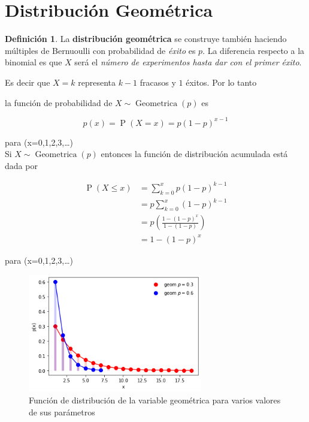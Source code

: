 \documentclass[]{book}
\theoremstyle{plain}
\theoremstyle{definition}
\newtheorem{definition}[theorem]{Definición}
\theoremstyle{definition} %
\begin{document}
\section{Distribución Geométrica} 

\begin{definition}
  
La \textbf{distribución geométrica} se construye también haciendo
múltiples de Bernuoulli con probabilidad de \emph{éxito} es \(p\). La
diferencia respecto a la binomial es que \(X\) será el \emph{número de
experimentos hasta dar con el primer éxito}.

Es decir que \(X=k\) representa \(k-1\) fracasos y \(1\) éxitos. Por lo
tanto

la función de probabilidad de
\(\displaystyle X\sim \operatorname {Geometrica} (p)\) es

\[p(x) = \displaystyle \operatorname {P} (X=x)=p(1-p)^{x-1}\]

para (x=0,1,2,3,\dots )\\

Si \(X\sim \operatorname {Geometrica} (p)\) entonces la función de
distribución acumulada está dada por

\[\begin{aligned}\operatorname {P} (X\leq x)&=\sum _{k=0}^{x}p(1-p)^{k-1}\\&=p\sum _{k=0}^{x}(1-p)^{k-1}\\&=p\left({\frac {1-(1-p)^{x}}{1-(1-p)}}\right)\\&=1-(1-p)^{x}\end{aligned}\]

para (x=0,1,2,3,\dots)
\end{definition}

\begin{figure}
  \centering
  \includegraphics[width=3in,height=\textheight]{img/geom.png}
  \caption{Función de distribución de la variable geométrica para varios valores de sus parámetros}
\end{figure}
\end{document}
